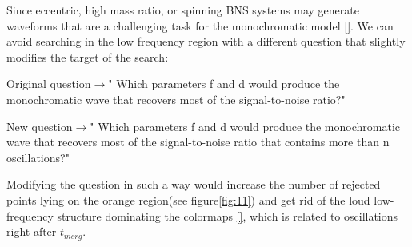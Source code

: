 \FloatBarrier



Since eccentric, high mass ratio, or spinning BNS systems may generate waveforms that are a challenging task for the monochromatic model \ref{}. We can avoid searching in the low frequency region with a different question that slightly modifies the target of the search:

Original question$\rightarrow$" Which parameters f and d would produce the monochromatic wave that recovers most of the signal-to-noise ratio?"

New question$\rightarrow$" Which parameters f and d would produce the monochromatic wave that recovers most of the signal-to-noise ratio that contains more than n oscillations?"


Modifying the question in such a way would increase the number of rejected points lying on the orange region(see figure\ref{fig:11}) and get rid of the loud low-frequency structure dominating the colormaps \ref{}, which is related to oscillations right after $t_{merg}$.


